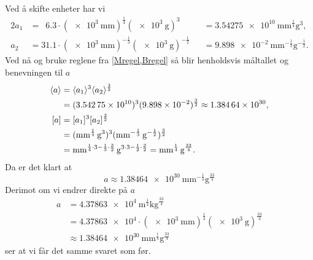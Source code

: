 \documentclass[a4paper,11pt]{article}
\begin{document}
\begin{solution}
    Ved å skifte enheter har vi
    \begin{alignat*}{2}
      a_1 &= \phantom{3}\num{6.3} \cdot (\SI{e3}{\milli\m})^{\frac{1}{4}}
                             (\SI{e3}{\g})^{3}
          &&= \SI{3.54275e10}{\milli\m\tothe{\frac{1}{4}}\g\cubed}, \\
      a_2 &= \num{31.1} \cdot (\SI{e3}{\milli\meter})^{-\frac{1}{3}}
                             (\SI{e3}{\g})^{-\frac{1}{2}}
          &&= \SI{9.898e-2}{\milli\meter\tothe{-\frac{1}{3}}\g\tothe{-\frac{1}{2}}}.
    \end{alignat*}
    Ved nå og bruke reglene fra \cref{Mregel,Bregel} så blir henholdsvis måltallet og benevningen til $a$
    \begin{align*}
        \brak{a} &= \brak{a_1}^{3}\brak{a_2}^{\frac{3}{2}} \\
                 &= (\num{3.54275e10})^{3}(\num{9.898e-2})^{\frac{3}{2}} 
                  \approx \num{1.38464e30}, \\
        \bpar{a} &= \bpar{a_1}^{3}\bpar{a_2}^{\frac{3}{2}} \\
                 &= (\si{\milli\m\tothe{\frac{1}{4}}\g\cubed})^{3}
                    (\si{\milli\m\tothe{-\frac{1}{3}}\g\tothe{-\frac{1}{2}}})^{\frac{3}{2}} \\
                & = \si{\milli\m\tothe{\frac{1}{4}\cdot 3 - \frac{1}{3}\cdot \frac{3}{2}}%
                        \g\tothe{3\cdot 3 - \frac{1}{2} \cdot \frac{3}{2}}}
                  = \si{\milli\m\tothe{\frac{1}{4}}\g\tothe{\frac{33}{4}}}.
    \end{align*}
    Da er det klart at
    \begin{equation}
        a \approx \SI{1.38464e30}{\milli\m\tothe{-\frac{1}{4}}\g\tothe{\frac{33}{4}}}
    \end{equation}
    Derimot om vi endrer direkte på $a$
    \begin{align*}
        a &= \SI{4.37863e4}{\m\tothe{\frac{1}{4}}\kg\tothe{\frac{33}{4}}}\\
          &= \num{4.37863e4} \cdot (\SI{e3}{\milli\m})^{\frac{1}{4}} 
                           (\SI{e3}{\g})^{\frac{33}{4}} \\
          &\approx
          \SI{1.38464e30}{\milli\m\tothe{\frac{1}{4}}\g\tothe{\frac{33}{4}}}
    \end{align*}
    ser at vi får det samme svaret som før. 
\end{solution}
\end{document}
